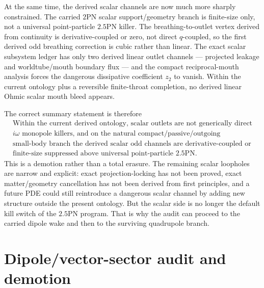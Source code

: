 \documentclass[11pt]{article}
\begin{document}
At the same time, the derived scalar channels are now much more sharply
constrained.  The carried $2$PN scalar support/geometry branch is finite-size
only, not a universal point-particle $2.5$PN killer.  The breathing-to-outlet
vertex derived from continuity is derivative-coupled or zero, not direct
\(q\)-coupled, so the first derived odd breathing correction is cubic rather than
linear.  The exact scalar subsystem ledger has only two derived linear outlet
channels --- projected leakage and worldtube/mouth boundary flux --- and the
compact reciprocal-mouth analysis forces the dangerous dissipative coefficient
\(z_2\) to vanish.  Within the current ontology plus a reversible finite-throat
completion, no derived linear Ohmic scalar mouth bleed appears.

The correct summary statement is therefore
\[
\boxed{\begin{gathered}
\text{Within the current derived ontology, scalar outlets are not generically direct}\\
\text{$i\omega$ monopole killers, and on the natural compact/passive/outgoing}\\
\text{small-body branch the derived scalar odd channels are derivative-coupled or}\\
\text{finite-size suppressed above universal point-particle }2.5\text{PN.}
\end{gathered}}
\]
This is a demotion rather than a total erasure.  The remaining scalar loopholes
are narrow and explicit: exact projection-locking has not been proved,
exact matter/geometry cancellation has not been derived from first principles,
and a future PDE could still reintroduce a dangerous scalar channel by adding new
structure outside the present ontology.  But the scalar side is no longer the
default kill switch of the $2.5$PN program.  That is why the audit can proceed to
the carried dipole wake and then to the surviving quadrupole branch.

\section{Dipole/vector-sector audit and demotion}
\label{sec:dipole-audit-demotion}
\end{document}

